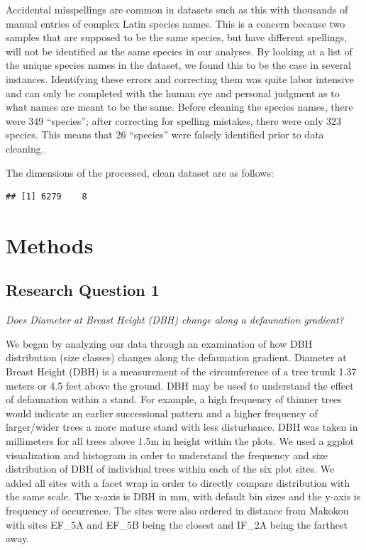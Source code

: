 \documentclass[
  12pt,
]{article}
\begin{document}
Accidental misspellings are common in datasets such as this with
thousands of manual entries of complex Latin species names. This is a
concern because two samples that are supposed to be the same species,
but have different spellings, will not be identified as the same species
in our analyses. By looking at a list of the unique species names in the
dataset, we found this to be the case in several instances. Identifying
these errors and correcting them was quite labor intensive and can only
be completed with the human eye and personal judgment as to what names
are meant to be the same. Before cleaning the species names, there were
349 ``species''; after correcting for spelling mistakes, there were only
323 species. This means that 26 ``species'' were falsely identified
prior to data cleaning.

The dimensions of the processed, clean dataset are as follows:

\begin{verbatim}
## [1] 6279    8
\end{verbatim}

\newpage

\hypertarget{methods}{%
\section{Methods}\label{methods}}

\hypertarget{research-question-1}{%
\subsection{Research Question 1}\label{research-question-1}}

\emph{Does Diameter at Breast Height (DBH) change along a defaunation
gradient?}

We began by analyzing our data through an examination of how DBH
distribution (size classes) changes along the defaunation gradient.
Diameter at Breast Height (DBH) is a measurement of the circumference of
a tree trunk 1.37 meters or 4.5 feet above the ground. DBH may be used
to understand the effect of defaunation within a stand. For example, a
high frequency of thinner trees would indicate an earlier successional
pattern and a higher frequency of larger/wider trees a more mature stand
with less disturbance. DBH was taken in millimeters for all trees above
1.5m in height within the plots. We used a ggplot visualization and
histogram in order to understand the frequency and size distribution of
DBH of individual trees within each of the six plot sites. We added all
sites with a facet wrap in order to directly compare distribution with
the same scale. The x-axis is DBH in mm, with default bin sizes and the
y-axis is frequency of occurrence. The sites were also ordered in
distance from Makokou with sites EF\_5A and EF\_5B being the closest and
IF\_2A being the farthest away.
\end{document}
